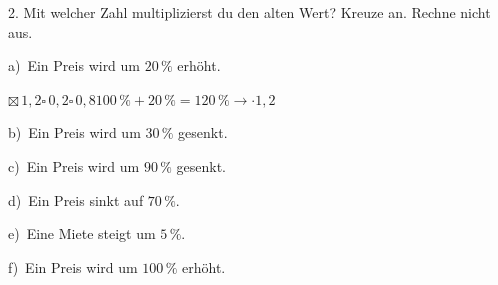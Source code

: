\documentclass[11pt]{article}
\newcommand{\grau}[1]{{\color{mbgrau}#1}}
\begin{document}
\begin{pfaufg}{}{2.}{}
Mit welcher Zahl multiplizierst du den alten Wert? Kreuze an. Rechne nicht aus.\par\medskip
\grau{a)\ Ein Preis wird um $20\,\%$ erhöht.\par\hspace*{1.2em}$\boxtimes$\,$1{,}2$\hspace{0.9em}$\square$\,$0{,}2$\hspace{0.9em}$\square$\,$0{,}8$\quad $100\,\% + 20\,\% = 120\,\% \to \cdot 1{,}2$}\par\medskip
b)\ Ein Preis wird um $30\,\%$ gesenkt.\par\hspace*{1.2em}\par\medskip
c)\ Ein Preis wird um $90\,\%$ gesenkt.\par\hspace*{1.2em}\par\medskip
d)\ Ein Preis sinkt auf $70\,\%$.\par\hspace*{1.2em}\par\medskip
e)\ Eine Miete steigt um $5\,\%$.\par\hspace*{1.2em}\par\medskip
f)\ Ein Preis wird um $100\,\%$ erhöht.\par\hspace*{1.2em}\par
{}
\end{pfaufg}
\end{document}
